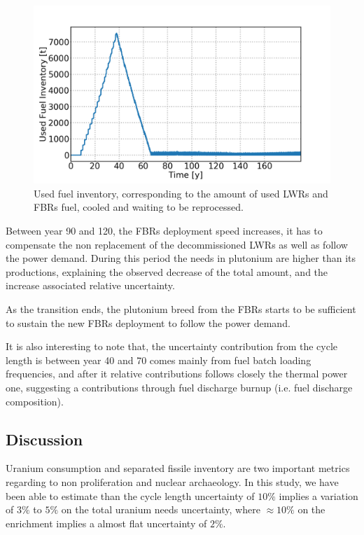 \documentclass{anstrans}
\begin{document}
\begin{figure}[ht] %
    \centering
    \includegraphics[scale=0.18]{used_fuel}
    \caption{Used fuel inventory, corresponding to the amount of used
    \glspl{LWR} and \glspl{FBR} fuel, cooled and waiting to be reprocessed.}
    \label{fig:used_fuel}
\end{figure}
Between year 90 and 120, the \glspl{FBR} deployment speed increases, it has to
compensate the non replacement of the decommissioned \glspl{LWR} as well as
follow the power demand.  During this period the needs in plutonium are higher
than its productions, explaining the observed decrease of the total amount, and
the increase associated relative uncertainty.

As the transition ends, the plutonium breed from the \glspl{FBR} starts to be
sufficient to sustain the new \glspl{FBR} deployment to follow the power demand.

It is also interesting to note that, the uncertainty contribution from the cycle
length is between year 40 and 70 comes mainly from fuel batch loading
frequencies, and after it relative contributions follows closely the thermal
power one, suggesting a contributions through fuel discharge burnup (i.e.  fuel
discharge composition).

\subsection{Discussion}

Uranium consumption and separated fissile inventory are two important metrics
regarding to non proliferation and nuclear archaeology.  In this study, we have
been able to estimate than the cycle length uncertainty of $10\%$ implies a
variation of $3\%$ to $5\%$ on the total uranium needs uncertainty, where $\approx10\%$
on the enrichment implies a almost flat uncertainty of $2\%$.
\end{document}
